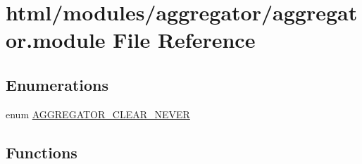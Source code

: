 \hypertarget{aggregator_8module}{
\section{html/modules/aggregator/aggregator.module File Reference}
\label{aggregator_8module}
}
\subsection*{Enumerations}
\begin{DoxyCompactItemize}
\item 
enum \hyperlink{aggregator_8module_a623ff7ad38eb829496a7e02a06fae000}{AGGREGATOR\_\-CLEAR\_\-NEVER} 
\end{DoxyCompactItemize}
\subsection*{Functions}
